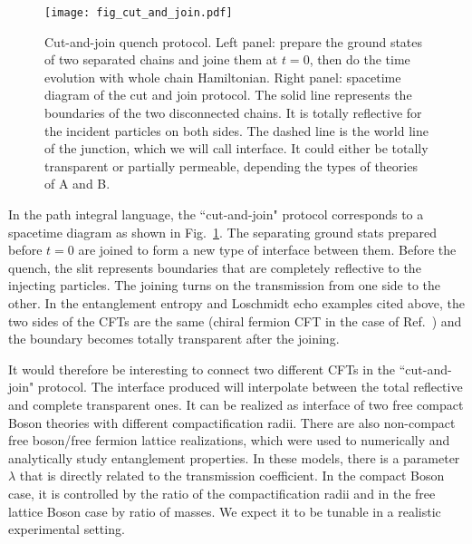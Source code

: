 \begin{figure}[h]
\texttt{[image: fig\_cut\_and\_join.pdf]}
\caption{Cut-and-join quench protocol. Left panel: prepare the ground states of two separated chains and joine them at $t = 0$, then do the time evolution with whole chain Hamiltonian. Right panel: spacetime diagram of the cut and join protocol. The solid line represents the boundaries of the two disconnected chains. It is totally reflective for the incident particles on both sides. The dashed line is the world line of the junction, which we will call interface. It could either be totally transparent or partially permeable, depending the types of theories of A and B.}
\label{fig:cut-and-join}
\end{figure}

In the path integral language, the ``cut-and-join" protocol corresponds to a spacetime diagram as shown in Fig.~\ref{fig:cut-and-join}. The separating ground stats prepared before $t = 0$ are joined to form a new type of interface between them. Before the quench, the slit represents boundaries that are completely reflective to the injecting particles. The joining turns on the transmission from one side to the other. In the entanglement entropy and Loschmidt echo examples cited above\cite{calabrese_entanglement_2007, calabrese_quantum_2016, vasseur_universal_2014}, the two sides of the CFTs are the same (chiral fermion CFT in the case of Ref.~) and the boundary becomes totally transparent after the joining. 

It would therefore be interesting to connect two different CFTs in the ``cut-and-join" protocol. The interface produced will interpolate between the total reflective and complete transparent ones. It can be realized as interface of two free compact Boson theories with different compactification radii\cite{bachas_permeable_2002}. There are also non-compact free boson/free fermion lattice realizations, which were used to numerically and analytically\cite{peschel_exact_2012,sakai_entanglement_2008} study entanglement properties. In these models, there is a parameter $\lambda$ that is directly related to the transmission coefficient. In the compact Boson case, it is controlled by the ratio of the compactification radii and in the free lattice Boson case by ratio of masses. We expect it to be tunable in a realistic experimental setting.

